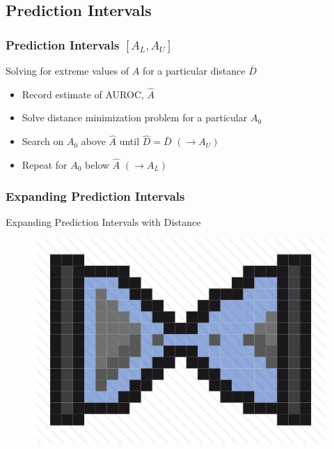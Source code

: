 \documentclass{beamer}
\begin{document}


\subsection{Prediction Intervals}



\begin{frame}
\frametitle{Prediction Intervals $[A_L, A_U]$}

Solving for extreme values of $A$ for a particular distance $\bar{D}$
\begin{itemize}
    \item Record estimate of AUROC, $\hat{A}$
    \item Solve distance minimization problem for a particular $A_0$
    \item Search on $A_0$ above $\hat{A}$ until $\hat{D} = \bar{D}$ $(\rightarrow A_U)$
    \item Repeat for $A_0$ below $\hat{A}$ $(\rightarrow A_L)$
\end{itemize}

\end{frame}


\begin{frame}
\frametitle{Expanding Prediction Intervals}

Expanding Prediction Intervals with Distance
\begin{figure}
    \includegraphics[scale =  0.5 ]{Figs/hourglass_icon_2.png}
\end{figure}

\end{frame}
\end{document}
